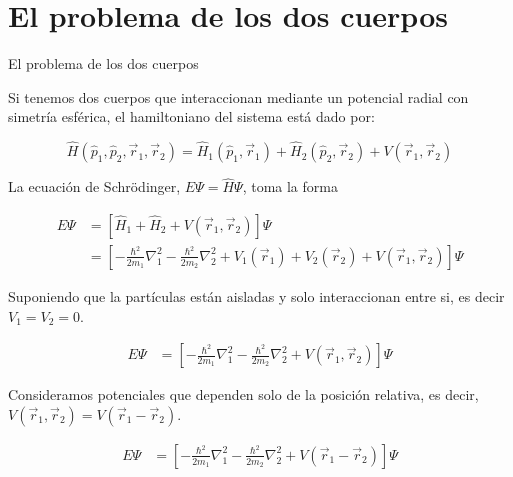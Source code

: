 \section{El problema de los dos cuerpos}

\begin{frame}{El problema de los dos cuerpos}

    Si tenemos dos cuerpos que interaccionan mediante un potencial radial con simetría esférica, el hamiltoniano del sistema está dado por:
        
    \begin{equation*}
        \hat{H} (\hat{p}_{1}, \hat{p}_{2}, \Vec{r}_{1}, \Vec{r}_{2}) = \hat{H}_{1} (\hat{p}_{1}, \Vec{r}_{1} ) + \hat{H}_{2} ( \hat{p}_{2}, \Vec{r}_{2}) + V(\Vec{r}_{1}, \Vec{r}_{2})
    \end{equation*}
        
    La ecuación de Schr\"odinger, $E \Psi=\hat{H} \Psi $, toma la forma \cite{de2014introduccion}
    
    \begin{align*}
        E \Psi &= \left[ \hat{H}_{1}  + \hat{H}_{2}  + V(\Vec{r}_{1}, \Vec{r}_{2}) \right] \Psi \\
        &=  \left[ - \frac{\hbar^2}{2m_{1}} \nabla^{2}_{1} - \frac{\hbar^2}{2m_{2}} \nabla^{2}_{2}  + V_{1} (\Vec{r}_1)   + V_{2} (\Vec{r}_2)  + V(\Vec{r}_{1}, \Vec{r}_{2}) \right] \Psi
    \end{align*}
    
\end{frame}

\begin{frame}{}

    Suponiendo que la partículas están aisladas y solo interaccionan entre si, es decir $V_{1}=V_{2}=0$.

    \begin{align*}
        E \Psi &=  \left[ - \frac{\hbar^2}{2m_{1}} \nabla^{2}_{1} - \frac{\hbar^2}{2m_{2}} \nabla^{2}_{2} + V(\Vec{r}_{1}, \Vec{r}_{2}) \right] \Psi
    \end{align*}
    
    Consideramos potenciales que dependen solo de la posición relativa, es decir, $V(\Vec{r}_{1}, \Vec{r}_{2}) = V(\Vec{r}_{1} - \Vec{r}_{2})$.
    
    \begin{align*}
        E \Psi &=  \left[ - \frac{\hbar^2}{2m_{1}} \nabla^{2}_{1} - \frac{\hbar^2}{2m_{2}} \nabla^{2}_{2} + V(\Vec{r}_{1} - \Vec{r}_{2}) \right] \Psi
    \end{align*}
    
\end{frame}

